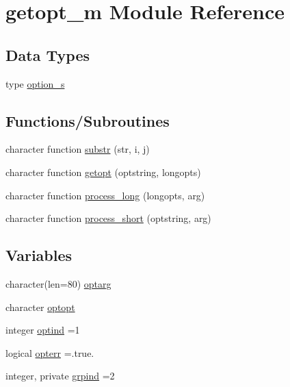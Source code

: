 \hypertarget{namespacegetopt__m}{}\section{getopt\+\_\+m Module Reference}
\label{namespacegetopt__m}
\subsection*{Data Types}
\begin{DoxyCompactItemize}
\item 
type \mbox{\hyperlink{structgetopt__m_1_1option__s}{option\+\_\+s}}
\end{DoxyCompactItemize}
\subsection*{Functions/\+Subroutines}
\begin{DoxyCompactItemize}
\item 
character function \mbox{\hyperlink{namespacegetopt__m_ab200fe1febc0e4b17c955268176647e8}{substr}} (str, i, j)
\item 
character function \mbox{\hyperlink{namespacegetopt__m_a39e6b73629162ef91cda0ccf207643a9}{getopt}} (optstring, longopts)
\item 
character function \mbox{\hyperlink{namespacegetopt__m_a588c76592ce4cff0901b32c7095ab6bb}{process\+\_\+long}} (longopts, arg)
\item 
character function \mbox{\hyperlink{namespacegetopt__m_ab9181edeba025c1b397b54536a3fb54d}{process\+\_\+short}} (optstring, arg)
\end{DoxyCompactItemize}
\subsection*{Variables}
\begin{DoxyCompactItemize}
\item 
character(len=80) \mbox{\hyperlink{namespacegetopt__m_a49ac94befd94285d69af0341beb97638}{optarg}}
\item 
character \mbox{\hyperlink{namespacegetopt__m_acf231054e6ff3ae54d963696c8c270aa}{optopt}}
\item 
integer \mbox{\hyperlink{namespacegetopt__m_a41cdbf24b473fe037d94b6311dbeeebc}{optind}} =1
\item 
logical \mbox{\hyperlink{namespacegetopt__m_a3e4c458844fed95e02a7006113230a6f}{opterr}} =.true.
\item 
integer, private \mbox{\hyperlink{namespacegetopt__m_a3579bc0473009d7fd52a77dc7df5e6b5}{grpind}} =2
\end{DoxyCompactItemize}


